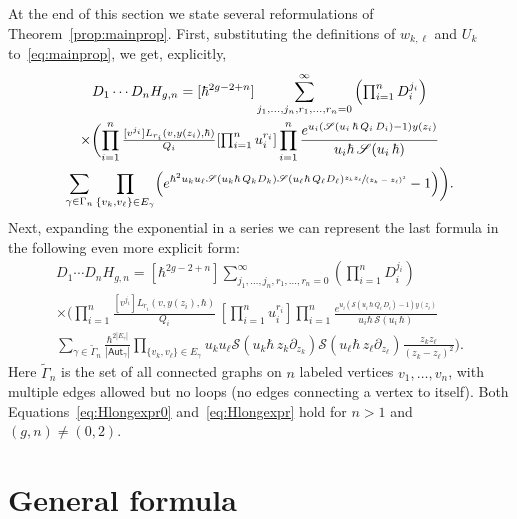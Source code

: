 \documentclass[JEP,XML,SOM,Unicode,NoEqCountersInSection,NoFloatCountersInSection]{cedram}
\let\mathcal\mathscr
\theoremstyle{plain}
\theoremstyle{definition}
\theoremstyle{remark}
\newcommand{\cS}{\mathcal{S}}
\begin{document}
At the end of this section we state several reformulations of Theorem~\ref{prop:mainprop}. First, substituting the definitions of $w_{k,\ell}$ and $U_k$ to~\eqref{eq:mainprop}, we get, explicitly,
\begin{multline}\label{eq:Hlongexpr0}
D_1\cdots D_nH_{g,n}=[\hbar^{2g-2+n}]
\sum_{j_1,\dots,j_n,r_1,\dots,r_n=0}^\infty \left(\textstyle\prod_{i=1}^nD_i^{j_i}\right)\\
\times\biggl(
\prod_{i=1}^n
\tfrac{[v^{j_i}]L_{r_i}(v,y(z_i),\hbar)}{Q_i}[{\textstyle\prod_{i=1}^n u_i^{r_i}}]
\prod_{i=1}^n
\frac{e^{u_i(\cS(u_i\,\hbar\,Q_i\,D_i)-1)y(z_i)}}{u_i\hbar\,\cS(u_i\,\hbar)}\\
\sum_{\gamma \in \Gamma_n}\prod_{\{v_k,v_\ell\}\in E_\gamma}
\Bigl(e^{\hbar^2u_ku_\ell\cS(u_k\hbar\,Q_k D_k)\cS(u_\ell\hbar\,Q_\ell D_\ell)
\sfrac{z_k z_\ell}{(z_k-z_\ell)^2}}-1\Bigr)\biggr).
\end{multline}
Next, expanding the exponential in a series we can represent the last formula in the following even more explicit form:\vspace*{-5pt}\enlargethispage{.5\baselineskip}%
\begin{multline}\label{eq:Hlongexpr}
D_1\cdots D_nH_{g,n}=[\hbar^{2g-2+n}]
\sum_{j_1,\dots,j_n,r_1,\dots,r_n=0}^\infty \left(\textstyle\prod_{i=1}^nD_i^{j_i}\right)\\[-3pt]
\times\biggl(
\prod_{i=1}^n
\frac{[v^{j_i}]L_{r_i}(v,y(z_i),\hbar)}{Q_i}\, [{\textstyle\prod_{i=1}^n u_i^{r_i}}]
\prod_{i=1}^n
\frac{e^{u_i(\cS(u_i\,\hbar\,Q_i\,D_i)-1)y(z_i)}}{u_i\hbar\,\cS(u_i\,\hbar)}\\[-2pt]
\sum_{\gamma\in\widetilde{\Gamma}_n} \frac{\hbar^{2|E_\gamma|}}{|\mathsf{Aut}_\gamma|} \prod_{\{v_k,v_\ell\}\in E_\gamma} u_ku_\ell \cS(u_k\hbar\,z_k\partial_{z_k})\cS(u_\ell\hbar\,z_\ell\partial_{z_\ell})\frac{ z_kz_\ell}{(z_k-z_\ell)^2}\biggr).
\end{multline}
Here $\widetilde{\Gamma}_n$
is the set of all connected graphs
on $n$ labeled vertices $v_1,\ldots,v_n$, with multiple edges allowed but no loops
(\ie no edges connecting a vertex to itself). Both Equations~\eqref{eq:Hlongexpr0} and~\eqref{eq:Hlongexpr} hold for $n>1$ and $(g,n)\ne(0,2)$.

\section{General formula} \label{sec:MainTh}
\end{document}
